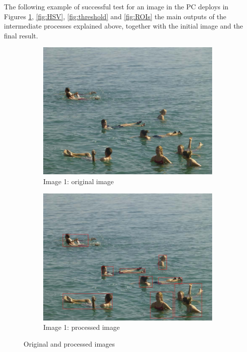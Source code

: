 
The following example of successful test for an image in the PC deploys in Figures \ref{fig:original_final},
\ref{fig:HSV}, \ref{fig:threshold} and \ref{fig:ROIs} the main outputs of the intermediate processes explained above,
together with the initial image and the final result. 

\begin{figure}[h]
        \centering
        \begin{subfigure}[h]{0.3\textwidth}
                \includegraphics[width=\textwidth]{Images/ocean7}
                \caption{Image 1: original image}
        \end{subfigure}%
        \quad
        \begin{subfigure}[h]{0.3\textwidth}
                \includegraphics[width=\textwidth]{Images/final}
                \caption{Image 1: processed image}
        \end{subfigure}
        \caption{Original and processed images}
        \label{fig:original_final}
\end{figure}

